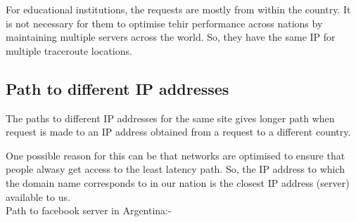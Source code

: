 For educational institutions, the requests are mostly from within the country. It is not necessary for them to optimise tehir 
performance across nations by maintaining multiple servers across the world. So, they have the same IP for multiple traceroute
locations.

\subsection*{ Path to different IP addresses}

The paths to different IP addresses for the same site gives longer path when request is made to an IP address obtained from a request 
to a different country. 

One possible reason for this can be that networks are optimised to ensure that people alwasy get access to the least latency path. So,
the IP address to which the domain name corresponds to in our nation is the closest IP address (server) available to us.\\

Path to facebook server in Argentina:-

